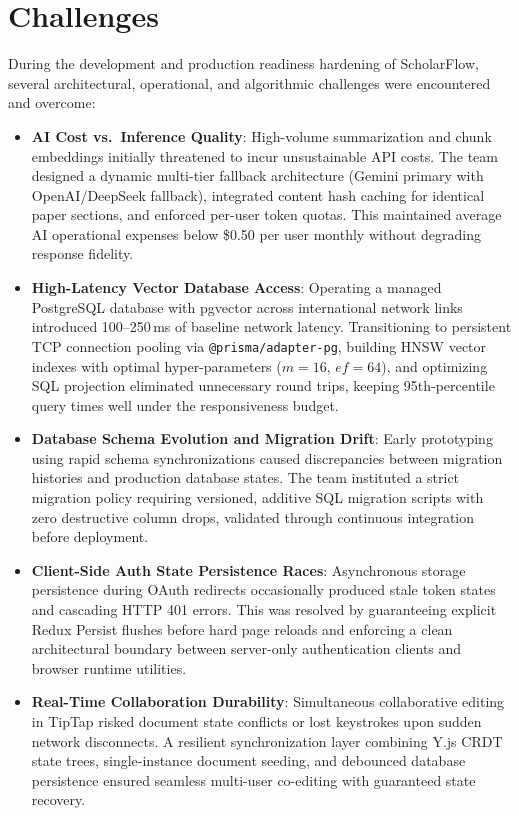 \section{Challenges}
During the development and production readiness hardening of ScholarFlow, several architectural, operational, and algorithmic challenges were encountered and overcome:

\begin{itemize}
\item \textbf{AI Cost vs.\ Inference Quality}: High-volume summarization and chunk embeddings initially threatened to incur unsustainable API costs. The team designed a dynamic multi-tier fallback architecture (Gemini primary with OpenAI/DeepSeek fallback), integrated content hash caching for identical paper sections, and enforced per-user token quotas. This maintained average AI operational expenses below \$0.50 per user monthly without degrading response fidelity.
\item \textbf{High-Latency Vector Database Access}: Operating a managed PostgreSQL database with pgvector across international network links introduced 100--250\,ms of baseline network latency. Transitioning to persistent TCP connection pooling via \texttt{@prisma/adapter-pg}, building HNSW vector indexes with optimal hyper-parameters ($m=16$, $ef=64$), and optimizing SQL projection eliminated unnecessary round trips, keeping 95th-percentile query times well under the responsiveness budget.
\item \textbf{Database Schema Evolution and Migration Drift}: Early prototyping using rapid schema synchronizations caused discrepancies between migration histories and production database states. The team instituted a strict migration policy requiring versioned, additive SQL migration scripts with zero destructive column drops, validated through continuous integration before deployment.
\item \textbf{Client-Side Auth State Persistence Races}: Asynchronous storage persistence during OAuth redirects occasionally produced stale token states and cascading HTTP 401 errors. This was resolved by guaranteeing explicit Redux Persist flushes before hard page reloads and enforcing a clean architectural boundary between server-only authentication clients and browser runtime utilities.
\item \textbf{Real-Time Collaboration Durability}: Simultaneous collaborative editing in TipTap risked document state conflicts or lost keystrokes upon sudden network disconnects. A resilient synchronization layer combining Y.js CRDT state trees, single-instance document seeding, and debounced database persistence ensured seamless multi-user co-editing with guaranteed state recovery.
\end{itemize}
